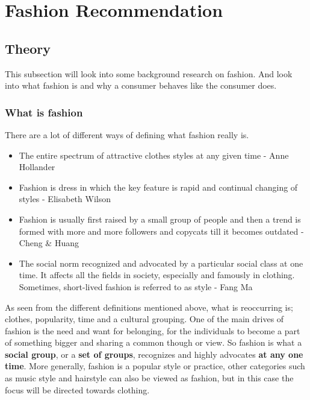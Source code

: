 
\section{Fashion Recommendation}


\subsection{Theory}
  \label{subsec:theory}
  This subsection will look into some background research on fashion.  And look
  into what fashion is and why a consumer behaves like the consumer does.

\subsubsection{What is fashion}
  There are a lot of different ways of defining what fashion really is.

  \begin{itemize}
      \item The entire spectrum of attractive clothes styles at any given time -
      Anne Hollander
      \item Fashion is dress in which the key feature is rapid and continual
      changing of styles - Elisabeth Wilson
      \item Fashion is usually first raised by a small group of people and then a
      trend is formed with more and more followers and copycats till it becomes
      outdated - Cheng \& Huang
      \item The social norm recognized and advocated by a particular social class
      at one time. It affects all the fields in society, especially and famously
      in clothing. Sometimes, short-lived fashion is referred to as style - Fang
      Ma \cite{Fang2012}
  \end{itemize}

  As seen from the different definitions mentioned above, what is reoccurring is;
  clothes, popularity, time and a cultural grouping.
  One of the main drives of fashion is the need and want for belonging, for the individuals to become a part of something bigger and sharing a common though or view.
  So fashion is what a \textbf{social group}, or a \textbf{set of groups}, recognizes and highly advocates \textbf{at any one time}.
  More generally, fashion is a popular style or practice, other categories such as music style and hairstyle can also be viewed as fashion, but in this case the focus will be directed towards clothing.

